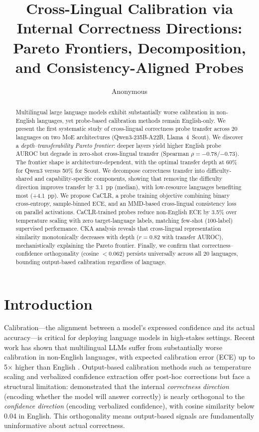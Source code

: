 \documentclass[11pt,a4paper]{article}
\title{Cross-Lingual Calibration via Internal Correctness Directions:\\Pareto Frontiers, Decomposition, and Consistency-Aligned Probes}
\author{Anonymous}
\begin{document}
\maketitle

\begin{abstract}
Multilingual large language models exhibit substantially worse calibration in non-English languages, yet probe-based calibration methods remain English-only.
We present the first systematic study of cross-lingual correctness probe transfer across 20 languages on two MoE architectures (Qwen3-235B-A22B, Llama~4~Scout).
We discover a \emph{depth--transferability Pareto frontier}: deeper layers yield higher English probe AUROC but degrade in zero-shot cross-lingual transfer (Spearman $\rho=-0.78$/$-0.73$).
The frontier shape is architecture-dependent, with the optimal transfer depth at 60\% for Qwen3 versus 50\% for Scout.
We decompose correctness transfer into difficulty-shared and capability-specific components, showing that removing the difficulty direction improves transfer by 3.1~pp (median), with low-resource languages benefiting most (+4.1~pp).
We propose CaCLR, a probe training objective combining binary cross-entropy, sample-binned ECE, and an MMD-based cross-lingual consistency loss on parallel activations.
CaCLR-trained probes reduce non-English ECE by 3.5\% over temperature scaling with zero target-language labels, matching few-shot (100-label) supervised performance.
CKA analysis reveals that cross-lingual representation similarity monotonically decreases with depth ($r=0.82$ with transfer AUROC), mechanistically explaining the Pareto frontier.
Finally, we confirm that correctness--confidence orthogonality (cosine $<0.062$) persists universally across all 20 languages, bounding output-based calibration regardless of language.
\end{abstract}

\section{Introduction}
\label{sec:intro}

Calibration---the alignment between a model's expressed confidence and its actual accuracy---is critical for deploying language models in high-stakes settings.
Recent work has shown that multilingual LLMs suffer from substantially worse calibration in non-English languages, with expected calibration error (ECE) up to 5$\times$ higher than English \cite{}.
Output-based calibration methods such as temperature scaling \cite{guo2017calibration} and verbalized confidence extraction \cite{} offer post-hoc corrections but face a structural limitation:
\citet{} demonstrated that the internal \emph{correctness direction} (encoding whether the model will answer correctly) is nearly orthogonal to the \emph{confidence direction} (encoding verbalized confidence), with cosine similarity below 0.04 in English.
This orthogonality means output-based signals are fundamentally uninformative about actual correctness.
\end{document}
